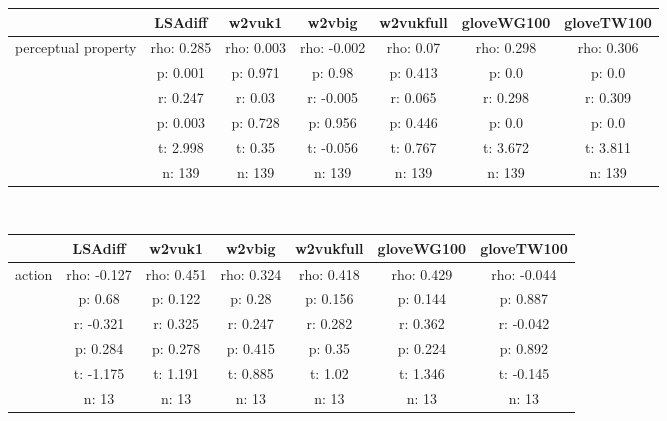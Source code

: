 \documentclass{article}
\begin{document}
\begin{tabular}{ccccccc|}\cline{2-7}
&\multicolumn{1}{|c}{LSAdiff} & w2vuk1 & w2vbig & w2vukfull & gloveWG100 & gloveTW100 \\\hline
\multicolumn{1}{|c|}{\multirow{6}{*}{perceptual property}} & rho: 0.285 & rho: 0.003 & rho: -0.002 & rho: 0.07 & rho: 0.298 & rho: 0.306 \\
\multicolumn{1}{|c|}{} & p: 0.001 & p: 0.971 & p: 0.98 & p: 0.413 & p: 0.0 & p: 0.0 \\
\multicolumn{1}{|c|}{} & r: 0.247 & r: 0.03 & r: -0.005 & r: 0.065 & r: 0.298 & r: 0.309 \\
\multicolumn{1}{|c|}{} & p: 0.003 & p: 0.728 & p: 0.956 & p: 0.446 & p: 0.0 & p: 0.0 \\
\multicolumn{1}{|c|}{} & t: 2.998 & t: 0.35 & t: -0.056 & t: 0.767 & t: 3.672 & t: 3.811 \\
\multicolumn{1}{|c|}{} & n: 139 & n: 139 & n: 139 & n: 139 & n: 139 & n: 139 \\
\hline
\end{tabular}\\
\begin{tabular}{ccccccc|}\cline{2-7}
&\multicolumn{1}{|c}{LSAdiff} & w2vuk1 & w2vbig & w2vukfull & gloveWG100 & gloveTW100 \\\hline
\multicolumn{1}{|c|}{\multirow{6}{*}{action}} & rho: -0.127 & rho: 0.451 & rho: 0.324 & rho: 0.418 & rho: 0.429 & rho: -0.044 \\
\multicolumn{1}{|c|}{} & p: 0.68 & p: 0.122 & p: 0.28 & p: 0.156 & p: 0.144 & p: 0.887 \\
\multicolumn{1}{|c|}{} & r: -0.321 & r: 0.325 & r: 0.247 & r: 0.282 & r: 0.362 & r: -0.042 \\
\multicolumn{1}{|c|}{} & p: 0.284 & p: 0.278 & p: 0.415 & p: 0.35 & p: 0.224 & p: 0.892 \\
\multicolumn{1}{|c|}{} & t: -1.175 & t: 1.191 & t: 0.885 & t: 1.02 & t: 1.346 & t: -0.145 \\
\multicolumn{1}{|c|}{} & n: 13 & n: 13 & n: 13 & n: 13 & n: 13 & n: 13 \\
\hline
\end{tabular}\\
\end{document}
